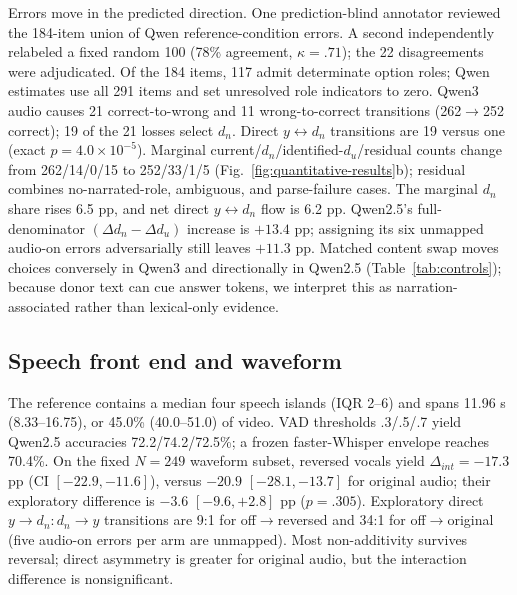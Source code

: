 Errors move in the predicted direction. One prediction-blind annotator reviewed the 184-item union of Qwen reference-condition errors. A second independently relabeled a fixed random 100 (78\% agreement, $\kappa=.71$); the 22 disagreements were adjudicated. Of the 184 items, 117 admit determinate option roles; Qwen estimates use all 291 items and set unresolved role indicators to zero. Qwen3 audio causes 21 correct-to-wrong and 11 wrong-to-correct transitions (262$\to$252 correct); 19 of the 21 losses select $d_n$. Direct $y\!\leftrightarrow\!d_n$ transitions are 19 versus one (exact $p=4.0\times10^{-5}$). Marginal current/$d_n$/identified-$d_u$/residual counts change from 262/14/0/15 to 252/33/1/5 (Fig.~\ref{fig:quantitative-results}b); residual combines no-narrated-role, ambiguous, and parse-failure cases. The marginal $d_n$ share rises 6.5 pp, and net direct $y\!\leftrightarrow\!d_n$ flow is 6.2 pp. Qwen2.5's full-denominator $(\Delta d_n-\Delta d_u)$ increase is $+13.4$ pp; assigning its six unmapped audio-on errors adversarially still leaves $+11.3$ pp. Matched content swap moves choices conversely in Qwen3 and directionally in Qwen2.5 (Table~\ref{tab:controls}); because donor text can cue answer tokens, we interpret this as narration-associated rather than lexical-only evidence.

\begin{table}[t]
\centering
\caption{Controls in factorial, temporal/visual, and narration/scope blocks. Q2.5/Q3/VL2.1 denote Qwen2.5/Qwen3/VideoLLaMA2.1; $N=291$ unless noted. All were frozen pre-inference and output-blind except label-informed content swap; bare/localized/content rows are Holm-controlled follow-ups. CIs use paired source-video bootstrap.}
\label{tab:controls}

\end{table}

\subsection{Speech front end and waveform}

The reference contains a median four speech islands (IQR 2--6) and spans 11.96 s (8.33--16.75), or 45.0\% (40.0--51.0) of video. VAD thresholds .3/.5/.7 yield Qwen2.5 accuracies 72.2/74.2/72.5\%; a frozen faster-Whisper envelope reaches 70.4\%. On the fixed $N=249$ waveform subset, reversed vocals yield $\Delta_{int}=-17.3$ pp (CI $[-22.9,-11.6]$), versus $-20.9$ $[-28.1,-13.7]$ for original audio; their exploratory difference is $-3.6$ $[-9.6,+2.8]$ pp ($p=.305$). Exploratory direct $y\to d_n:d_n\to y$ transitions are 9:1 for off$\to$reversed and 34:1 for off$\to$original (five audio-on errors per arm are unmapped). Most non-additivity survives reversal; direct asymmetry is greater for original audio, but the interaction difference is nonsignificant.


